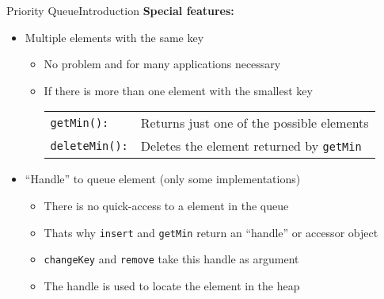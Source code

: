 
\begin{frame}{Priority Queue}{Introduction}
  \textbf{Special features:}
  \begin{itemize}
    \item
      Multiple elements with the same key
      \begin{itemize}
        \item
          No problem and for many applications necessary
        \item
          If there is more than one element with the smallest key
          \begin{tabular}{ll}
            {\color{Mittel-Blau}\texttt{getMin():}} &
            Returns just one of the possible elements\\
            {\color{Mittel-Blau}\texttt{deleteMin():}} &
            Deletes the element returned by
            {\color{Mittel-Blau}\texttt{getMin}}
          \end{tabular}
      \end{itemize}
      \vspace{0.5em}
    \item
      \enquote{Handle} to queue element (only some implementations)
      \begin{itemize}
        \item
          There is no quick-access to a element in the queue
        \item
          Thats why {\color{Mittel-Blau}\texttt{insert}} and
          {\color{Mittel-Blau}\texttt{getMin}} return an \enquote{handle}
          or accessor object
        \item
          {\color{Mittel-Blau}\texttt{changeKey}} and
          {\color{Mittel-Blau}\texttt{remove}} take this handle as argument
        \item
          The handle is used to locate the element in the heap
      \end{itemize}
  \end{itemize}
\end{frame}



